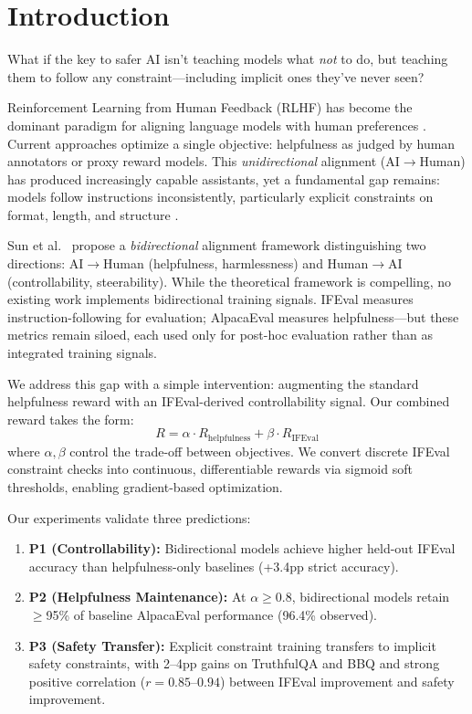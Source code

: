 \section{Introduction}
\label{sec:introduction}

What if the key to safer AI isn't teaching models what \emph{not} to do, but teaching them to follow any constraint---including implicit ones they've never seen?

Reinforcement Learning from Human Feedback (RLHF) has become the dominant paradigm for aligning language models with human preferences \citep{ouyang2022instructgpt}. Current approaches optimize a single objective: helpfulness as judged by human annotators or proxy reward models. This \emph{unidirectional} alignment (AI$\rightarrow$Human) has produced increasingly capable assistants, yet a fundamental gap remains: models follow instructions inconsistently, particularly explicit constraints on format, length, and structure \citep{zhou2023ifeval}.

Sun et al.\ \citep{sun2024bidirectional} propose a \emph{bidirectional} alignment framework distinguishing two directions: AI$\rightarrow$Human (helpfulness, harmlessness) and Human$\rightarrow$AI (controllability, steerability). While the theoretical framework is compelling, no existing work implements bidirectional training signals. IFEval \citep{zhou2023ifeval} measures instruction-following for evaluation; AlpacaEval \citep{dubois2024alpacaeval} measures helpfulness---but these metrics remain siloed, each used only for post-hoc evaluation rather than as integrated training signals.

We address this gap with a simple intervention: augmenting the standard helpfulness reward with an IFEval-derived controllability signal. Our combined reward takes the form:
\begin{equation}
R = \alpha \cdot R_{\text{helpfulness}} + \beta \cdot R_{\text{IFEval}}
\end{equation}
where $\alpha, \beta$ control the trade-off between objectives. We convert discrete IFEval constraint checks into continuous, differentiable rewards via sigmoid soft thresholds, enabling gradient-based optimization.

Our experiments validate three predictions:

\begin{enumerate}
    \item \textbf{P1 (Controllability):} Bidirectional models achieve higher held-out IFEval accuracy than helpfulness-only baselines (+3.4pp strict accuracy).
    \item \textbf{P2 (Helpfulness Maintenance):} At $\alpha \geq 0.8$, bidirectional models retain $\geq$95\% of baseline AlpacaEval performance (96.4\% observed).
    \item \textbf{P3 (Safety Transfer):} Explicit constraint training transfers to implicit safety constraints, with 2--4pp gains on TruthfulQA and BBQ and strong positive correlation ($r=0.85$--$0.94$) between IFEval improvement and safety improvement.
\end{enumerate}


